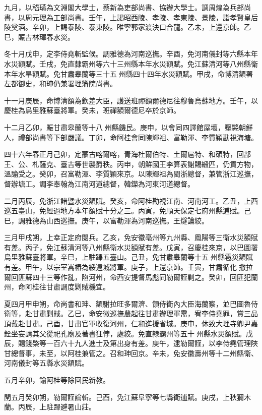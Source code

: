 \begin{pinyinscope}
九月，以嵇璜為文淵閣大學士，蔡新為吏部尚書、協辦大學士。調周煌為兵部尚書，以周元理為工部尚書。壬午，上謁昭西陵、孝陵、孝東陵、景陵，詣孝賢皇后陵奠酒。辛卯，上謁泰陵、泰東陵。睢寧郭家渡決口合龍。乙未，上還京師。乙巳，賑吉林琿春水災。

冬十月戊申，定李侍堯斬監候。調雅德為河南巡撫。辛酉，免河南儀封等六縣本年水災額賦。壬戌，免直隸霸州等六十三州縣本年水災額賦。免江蘇清河等八州縣衛本年水旱額賦。免甘肅皋蘭等三十五州縣四十四年水災額賦。甲戌，命博清額署左都御史，和珅仍兼署理籓院尚書。

十一月庚辰，命博清額為欽差大臣，護送班禪額爾德尼往穆魯烏蘇地方。壬午，以慶桂為烏里雅蘇臺將軍。癸未，班禪額爾德尼卒於京師。

十二月乙卯，賑甘肅皋蘭等十八州縣饑民。庚申，以會同四譯館屋壞，壓斃朝鮮人，禮部尚書等下部嚴議。丁卯，命阿桂會同陳輝祖、富勒渾、李質穎勘視海塘。

四十六年春正月己卯，定蒙古喀爾喀，青海杜爾伯特、土爾扈特、和碩特，回部王、公、札薩克、臺吉等世襲爵秩。丙申，朝鮮國王李算表謝賜緞匹，仍貢方物，溫諭受之。癸卯，召富勒渾、李質穎來京。以陳輝祖為閩浙總督，兼管浙江巡撫，督辦塘工。調李奉翰為江南河道總督，韓鑅為河東河道總督。

二月丙辰，免浙江諸暨水災額賦。癸亥，命阿桂勘視江南、河南河工。乙丑，上西巡五臺山，免經過地方本年額賦十分之三。丙寅，免順天保定七府州縣逋賦。己巳，調雅德為山西巡撫。庚午，以富勒渾為河南巡撫。王燧論絞。

三月甲戌朔，上幸正定府閱兵。乙亥，免安徽亳州等九州縣、鳳陽等三衛水災額賦有差。丙子，免江蘇清河等八州縣衛水災額賦有差。戊寅，召慶桂來京，以巴圖署烏里雅蘇臺將軍。辛巳，上駐蹕五臺山。己丑，免甘肅皋蘭等十五州縣雹災額賦有差。甲午，以宗室嵩椿為綏遠城將軍。庚子，上還京師。壬寅，甘肅循化撒拉爾回匪蘇四十三等作亂，陷河州，命西安提督馬彪同勒爾謹剿之。癸卯，回匪犯蘭州，命阿桂往甘肅調度剿賊機宜。

夏四月甲申朔，命尚書和珅、額駙拉旺多爾濟、領侍衛內大臣海蘭察，並巴圖魯侍衛等，赴甘肅剿賊。乙巳，命安徽巡撫農起往甘肅辦理軍需，宥李侍堯罪，賞三品頂戴赴甘肅。己酉，甘肅官軍收復河州，仁和進援省城。庚申，休致大理寺卿尹嘉銓坐妄請其父從祀孔廟及著書狂悖，處絞。免直隸霸州等五十州縣水災額賦。戊辰，賜錢棨等一百六十九人進士及第出身有差。庚午，逮勒爾謹，以李侍堯管理陜甘總督事，未至，以阿桂兼管之。召和珅回京。辛未，免安徽壽州等十二州縣衛、河南儀封等五縣水災額賦。

五月辛卯，諭阿桂等除回民新教。

閏五月癸卯朔，勒爾謹論斬。己酉，免江蘇阜寧等七縣衛逋賦。庚戌，上秋獮木蘭。丙辰，上駐蹕避暑山莊。


\end{pinyinscope}
